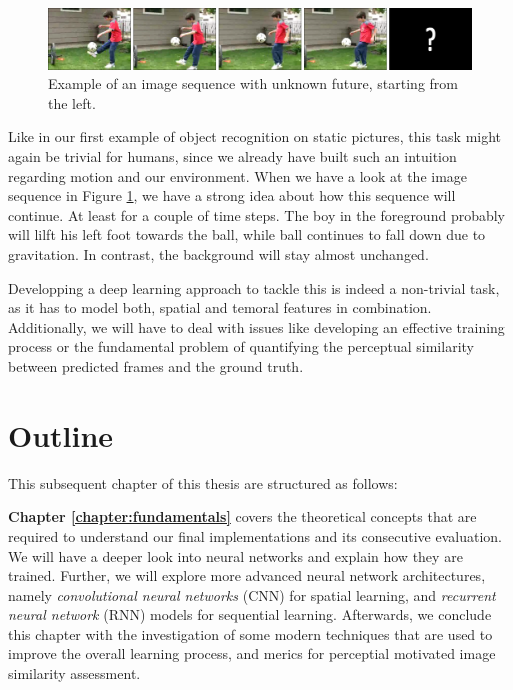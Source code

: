 \begin{figure}[htpb]
	\centering
	\includegraphics[scale=0.25]{figures/ucf-intro/serie1.png} 
	\caption[Example: Image sequence]{Example of an image sequence with unknown future, starting from the left.} \label{fig:intro-seq}
\end{figure}

Like in our first example of object recognition on static pictures, this task might again be trivial for humans, since we already have built such an intuition regarding motion and our environment. When we have a look at the image sequence in Figure \ref{fig:intro-seq}, we have a strong idea about how this sequence will continue. At least for a couple of time steps. The boy in the foreground probably will lilft his left foot towards the ball, while ball continues to fall down due to gravitation. In contrast, the background will stay almost unchanged.

Developping a deep learning approach to tackle this is indeed a non-trivial task, as it has to model both, spatial and temoral features in combination. Additionally, we will have to deal with issues like developing an effective training process or the fundamental problem of quantifying the perceptual similarity between predicted frames and the ground truth.


\section{Outline}

This subsequent chapter of this thesis are structured as follows:

\textbf{Chapter \ref{chapter:fundamentals}} covers the theoretical concepts that are required to understand our final implementations and its consecutive evaluation. We will have a deeper look into neural networks and explain how they are trained. Further, we will explore more advanced neural network architectures, namely \textit{convolutional neural networks} (CNN) for spatial learning, and \textit{recurrent neural network} (RNN) models for sequential learning. Afterwards, we conclude this chapter with the investigation of some modern techniques that are used to improve the overall learning process, and merics for perceptial motivated image similarity assessment.

